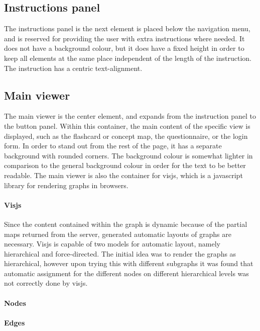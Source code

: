 \subsection{Instructions panel}

The instructions panel is the next element is placed below the navigation menu, and is reserved for providing the user with extra instructions where needed. It does not have a background colour, but it does have a fixed height in order to keep all elements at the same place independent of the length of the instruction. The instruction has a centric text-alignment.

\subsection{Main viewer}

The main viewer is the center element, and expands from the instruction panel to the button panel. Within this container, the main content of the specific view is displayed, such as the flashcard or concept map, the questionnaire, or the login form. In order to stand out from the rest of the page, it has a separate background with rounded corners. The background colour is somewhat lighter in comparison to the general background colour in order for the text to be better readable. The main viewer is also the container for visjs, which is a javascript library for rendering graphs in browsers.

\paragraph{Visjs} Since the content contained within the graph is dynamic because of the partial maps returned from the server, generated automatic layouts of graphs are necessary. Visjs is capable of two models for automatic layout, namely hierarchical and force-directed. The initial idea was to render the graphs as hierarchical, however upon trying this with different subgraphs it was found that automatic assignment for the different nodes on different hierarchical levels was not correctly done by visjs. %

\paragraph{Nodes}

\paragraph{Edges}

